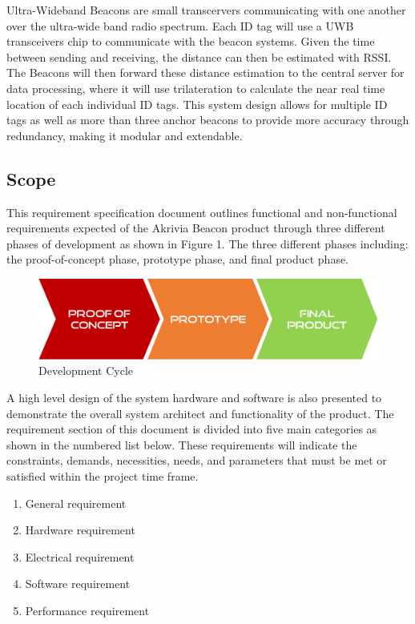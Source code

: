 \bigskip
Ultra-Wideband Beacons are small transcervers communicating with one another over the ultra-wide band radio spectrum. Each ID tag will use a UWB transceivers chip to communicate with the beacon systems. Given the time between sending and receiving, the distance can then be estimated with RSSI. The Beacons will then forward these distance estimation to the central server for data processing, where it will use trilateration to calculate the near real time location of each individual ID tags. This system design allows for multiple ID tags as well as more than three anchor beacons to provide more accuracy through redundancy, making it modular and extendable.

\break


\subsection{Scope}
This requirement specification document outlines functional and non-functional requirements expected of the Akrivia Beacon product through three different phases of development as shown in Figure 1. The three different phases  including: the proof-of-concept phase, prototype phase, and final product phase.
\medskip

\begin{figure}[H]
\centering
    \includegraphics[scale=0.4]{./images/dev-path.png}
    \caption{Development Cycle}
\end{figure}

A high level design of the system hardware and software is also presented to demonstrate the overall system architect and functionality of the product. The requirement section of this document is divided into five main categories as shown in the numbered list below. These requirements will indicate the constraints, demands, necessities, needs, and parameters that must be met or satisfied within the project time frame.

\begin{enumerate}
	\item General requirement 
	\item Hardware requirement 
	\item Electrical requirement 
	\item Software requirement 
	\item Performance requirement 
\end{enumerate}
\medskip

